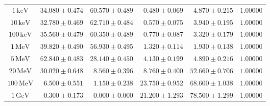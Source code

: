 \begin{tabular}{crrrrr}
\midrule
$1\,\mathrm{keV}$ & $34.080\pm0.474$ & $60.570\pm0.489$ & $0.480\pm0.069$ & $4.870\pm0.215$ & $1.00000$ \\
$10\,\mathrm{keV}$ & $32.780\pm0.469$ & $62.710\pm0.484$ & $0.570\pm0.075$ & $3.940\pm0.195$ & $1.00000$ \\
$100\,\mathrm{keV}$ & $35.560\pm0.479$ & $60.350\pm0.489$ & $0.770\pm0.087$ & $3.320\pm0.179$ & $1.00000$ \\
$1\,\mathrm{MeV}$ & $39.820\pm0.490$ & $56.930\pm0.495$ & $1.320\pm0.114$ & $1.930\pm0.138$ & $1.00000$ \\
$5\,\mathrm{MeV}$ & $62.840\pm0.483$ & $28.140\pm0.450$ & $4.130\pm0.199$ & $4.890\pm0.216$ & $1.00000$ \\
$20\,\mathrm{MeV}$ & $30.020\pm0.648$ & $8.560\pm0.396$ & $8.760\pm0.400$ & $52.660\pm0.706$ & $1.00000$ \\
$100\,\mathrm{MeV}$ & $6.500\pm0.551$ & $1.150\pm0.238$ & $23.750\pm0.952$ & $68.600\pm1.038$ & $1.00000$ \\
$1\,\mathrm{GeV}$ & $0.300\pm0.173$ & $0.000\pm0.000$ & $21.200\pm1.293$ & $78.500\pm1.299$ & $1.00000$ \\
\bottomrule
\end{tabular}
